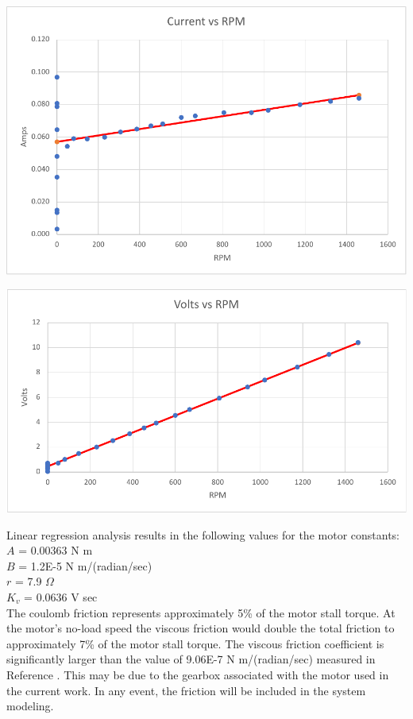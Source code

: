 \documentclass[12pt,letterpaper]{article}
\begin{document}
\begin{appendices}
\includegraphics[width=\textwidth]{images/current.pdf} 

\includegraphics[width=\textwidth]{images/voltage.pdf} 


Linear regression analysis results in the following values for the motor constants:\\
$A$ = 0.00363 N m\\
$B$ = 1.2E-5 N m/(radian/sec)\\
$r$ = 7.9 $\Omega$\\
$K_{v}$ = 0.0636 V sec\\

The coulomb friction represents approximately 5\% of the 
motor stall torque.  At the motor's no-load speed the viscous friction would double the total friction to 
approximately 7\% of the motor stall torque.  The viscous friction coefficient is significantly larger than
the value of 9.06E-7 N m/(radian/sec) measured in Reference \cite{twoWheeled}.  This may be due to
the gearbox associated with the motor used in the current work.  In any event, the friction will be included
in the system modeling.\\


\end{appendices}
\end{document}
